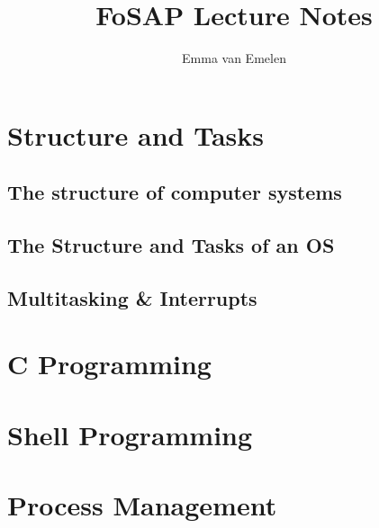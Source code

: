 \documentclass[a4paper, 11pt]{article}
\author{Emma van Emelen}
\title{FoSAP Lecture Notes}
\begin{document}
    \maketitle
    \newpage

    \tableofcontents
    \newpage

    \section{Structure and Tasks}
    \subsection{The structure of computer systems}
    \subsection{The Structure and Tasks of an OS}
    \subsection{Multitasking \& Interrupts}
    \newpage

    \section{C Programming}
    \newpage

    \section{Shell Programming}
    \newpage
    \section{Process Management}
\end{document}
